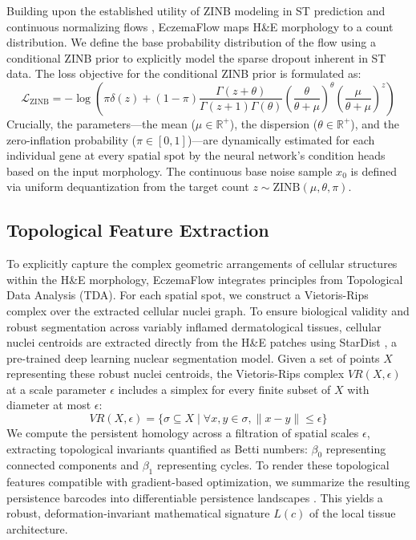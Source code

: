 \documentclass{bioinfo}
\begin{document}
Building upon the established utility of ZINB modeling in ST prediction \cite{hist2st2022,eraslan2019single} and continuous normalizing flows \cite{lipman2022flow,stflow2025}, EczemaFlow maps H\&E morphology to a count distribution. We define the base probability distribution of the flow using a conditional ZINB prior to explicitly model the sparse dropout inherent in ST data. The loss objective for the conditional ZINB prior is formulated as:
\begin{equation}
\label{eq:zinb}
    \mathcal{L}_{\text{ZINB}} = -\log \left( \pi \delta(z) + (1 - \pi) \frac{\Gamma(z + \theta)}{\Gamma(z + 1)\Gamma(\theta)} \left(\frac{\theta}{\theta + \mu}\right)^\theta \left(\frac{\mu}{\theta + \mu}\right)^z \right)
\end{equation}
Crucially, the parameters---the mean ($\mu \in \mathbb{R}^+$), the dispersion ($\theta \in \mathbb{R}^+$), and the zero-inflation probability ($\pi \in [0,1]$)---are dynamically estimated for each individual gene at every spatial spot by the neural network's condition heads based on the input morphology. The continuous base noise sample $x_0$ is defined via uniform dequantization from the target count $z \sim \text{ZINB}(\mu, \theta, \pi)$.

\subsection{Topological Feature Extraction}

To explicitly capture the complex geometric arrangements of cellular structures within the H\&E morphology, EczemaFlow integrates principles from Topological Data Analysis (TDA). For each spatial spot, we construct a Vietoris-Rips complex over the extracted cellular nuclei graph. To ensure biological validity and robust segmentation across variably inflamed dermatological tissues, cellular nuclei centroids are extracted directly from the H\&E patches using StarDist \cite{schmidt2018cell}, a pre-trained deep learning nuclear segmentation model. Given a set of points $X$ representing these robust nuclei centroids, the Vietoris-Rips complex $VR(X, \epsilon)$ at a scale parameter $\epsilon$ includes a simplex for every finite subset of $X$ with diameter at most $\epsilon$:
\begin{equation}
    VR(X, \epsilon) = \{ \sigma \subseteq X \mid \forall x,y \in \sigma, \|x-y\| \le \epsilon \}
\end{equation}
We compute the persistent homology across a filtration of spatial scales $\epsilon$, extracting topological invariants quantified as Betti numbers: $\beta_0$ representing connected components and $\beta_1$ representing cycles. To render these topological features compatible with gradient-based optimization, we summarize the resulting persistence barcodes into differentiable persistence landscapes \cite{bubenik2015statistical}. This yields a robust, deformation-invariant mathematical signature $L(c)$ of the local tissue architecture.
\end{document}
